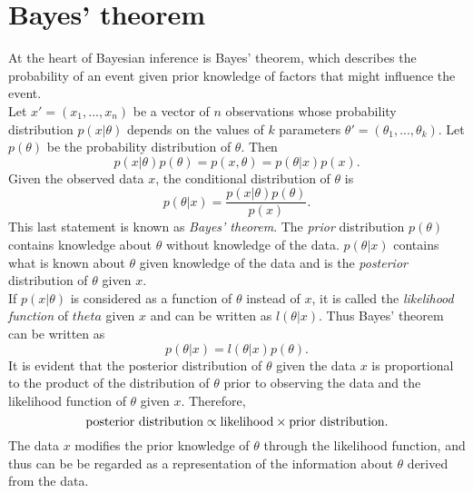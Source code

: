 \documentclass[12pt]{book}
\begin{document}
\section{Bayes' theorem}
At the heart of Bayesian inference is Bayes' theorem, which describes the probability of an event given prior knowledge of factors that might influence the event. \\
Let $x'=\left(x_1,...,x_n\right)$ be a vector of $n$ observations whose probability distribution $p\left(x|\theta\right)$ depends on the values of $k$ parameters $\theta'=\left(\theta_1,...,\theta_k\right)$. Let $p\left(\theta\right)$ be the probability distribution of $\theta$. Then 
\begin{equation}
    p\left(x|\theta\right)p\left(\theta\right)=p\left(x, \theta\right) = p\left(\theta|x\right)p\left(x\right).
\end{equation}
Given the observed data $x$, the conditional distribution of $\theta$ is
\begin{equation}
    p\left(\theta|x\right)=\frac{p\left(x|\theta\right)p\left(\theta\right)}{p\left(x\right)}.
\end{equation}
This last statement is known as \textit{Bayes' theorem}. The \textit{prior} distribution $p\left(\theta\right)$ contains knowledge about $\theta$ without knowledge of the data. $p\left(\theta|x\right)$ contains what is known about $\theta$ given knowledge of the data and is the \textit{posterior} distribution of $\theta$ given $x$. \\
If $p\left(x|\theta\right)$ is considered as a function of $\theta$ instead of $x$, it is called the \textit{likelihood function} of $theta$ given $x$ and can be written as $l\left(\theta|x\right)$. Thus Bayes' theorem can be written as
\begin{equation}
    p\left(\theta|x\right)=l\left(\theta|x\right)p\left(\theta\right).
\end{equation}
It is evident that the posterior distribution of $\theta$ given the data $x$ is proportional to the product of the distribution of $\theta$ prior to observing the data and the likelihood function of $\theta$ given $x$. Therefore,
\begin{equation*}
    \hbox{posterior distribution} \propto  \hbox{likelihood}\times\hbox{prior distribution}.
\end{equation*}
The data $x$ modifies the prior knowledge of $\theta$ through the likelihood function, and thus can be be regarded as a representation of the information about  $\theta$ derived from the data.\autocite[Cf.][]{box2011bayesian}
\end{document}
